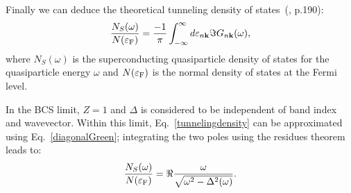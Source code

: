 \documentclass[final,3p,times,twocolumn]{elsarticle}
\begin{document}
Finally we can deduce the theoretical tunneling density of states~(\cite{Schrieffer1964}, p.190):
\begin{equation}\label{tunnelingdensity}
\frac{N_S(\omega)}{N(\varepsilon_{\rm F})} = \frac{-1}{\pi}\int_{-\infty}^{\infty} d\varepsilon_{n\mathbf{k}} \Im G_{n\mathbf{k}}(\omega),
\end{equation}
where $N_S(\omega)$ is the superconducting quasiparticle density of states for the quasiparticle energy $\omega$ and $N(\varepsilon_{\rm F})$ is the normal density of states at the Fermi level. 
                                                                                                                                                                                                                                                                                                                                                                                                                                                                                                                                                                                                                                                                                                                                       
                                                                                                                                                                                                                                                                                                                                                                                                                                                                                                                                                                                                                                                                                                                                       In the BCS limit, $Z=1$ and $\Delta$ is considered to be independent of band index and wavevector. Within this limit, Eq.~\eqref{tunnelingdensity} can be approximated using Eq.~\eqref{diagonalGreen}; integrating the two poles using the residues theorem leads to:
\begin{equation}\label{tunnelingdensity2}
\frac{N_S(\omega)}{N(\varepsilon_{\rm F})} = \Re  \frac{\omega}{\sqrt{\omega^2 - \Delta^2(\omega)}}.
\end{equation}
                                                                                                                                                                                                                                                                                                                                                                                                                                                                                                                                                                                                                                                                                                           
\end{document}
